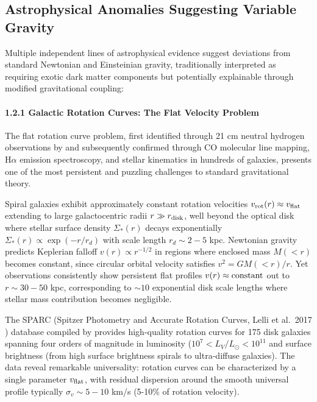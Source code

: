 \documentclass[10pt,a4paper]{article}
\begin{document}
\subsection{Astrophysical Anomalies Suggesting Variable
Gravity}\label{astrophysical-anomalies-suggesting-variable-gravity}

Multiple independent lines of astrophysical evidence suggest deviations
from standard Newtonian and Einsteinian gravity, traditionally
interpreted as requiring exotic dark matter components but potentially
explainable through modified gravitational coupling:

\paragraph{1.2.1 Galactic Rotation Curves: The Flat Velocity
Problem}\label{galactic-rotation-curves-the-flat-velocity-problem}

The flat rotation curve problem, first identified through 21 cm neutral
hydrogen observations by \cite{Rubin1970} and subsequently
confirmed through CO molecular line mapping, H$\alpha$ emission spectroscopy,
and stellar kinematics in hundreds of galaxies, presents one of the most
persistent and puzzling challenges to standard gravitational theory.

Spiral galaxies exhibit approximately constant rotation velocities
\(v_{\rm rot}(r) \approx v_{\rm flat}\) extending to large
galactocentric radii \(r \gg r_{\rm disk}\), well beyond the optical
disk where stellar surface density \(\Sigma_*(r)\) decays exponentially
\(\Sigma_*(r) \propto \exp(-r/r_d)\) with scale length \(r_d \sim 2-5\)
kpc. Newtonian gravity predicts Keplerian falloff
\(v(r) \propto r^{-1/2}\) in regions where enclosed mass \(M(<r)\)
becomes constant, since circular orbital velocity satisfies
\(v^2 = GM(<r)/r\). Yet observations consistently show persistent flat
profiles \(v(r) \approx {\rm constant}\) out to \(r \sim 30-50\) kpc,
corresponding to \(\sim 10\) exponential disk scale lengths where
stellar mass contribution becomes negligible.

The SPARC (Spitzer Photometry and Accurate Rotation Curves, Lelli et al.\ 2017 \cite{Lelli2017}) database
compiled by \cite{Lelli2016} provides high-quality rotation curves
for 175 disk galaxies spanning four orders of magnitude in luminosity
(\(10^7 < L_V/L_\odot < 10^{11}\) and surface brightness (from high
surface brightness spirals to ultra-diffuse galaxies). The data reveal
remarkable universality: rotation curves can be characterized by a
single parameter \(v_{\rm flat}\), with residual dispersion around the
smooth universal profile typically \(\sigma_v \sim 5-10\) km/s (5-10\%
of rotation velocity).
\end{document}
